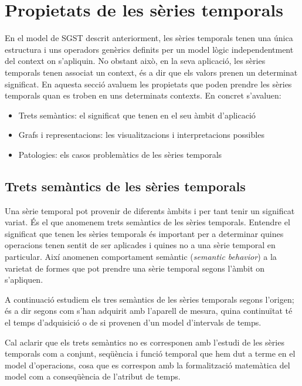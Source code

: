 \section{Propietats de les sèries temporals}

En el model de \gls{SGST} descrit anteriorment, les sèries temporals
tenen una única estructura i uns operadors genèrics definits per un
model lògic independentment del context on s'apliquin. No obstant
això, en la seva aplicació, les sèries temporals tenen associat un
context, és a dir que els valors prenen un determinat significat. En
aquesta secció avaluem les propietats que poden prendre les sèries
temporals quan es troben en uns determinats contexts. En concret
s'avaluen:
\begin{itemize}
\item Trets semàntics: el significat que tenen en
  el seu àmbit d'aplicació
\item Grafs i representacions: les visualitzacions i interpretacions
  possibles
\item Patologies: els casos problemàtics de les sèries temporals
\end{itemize}




\subsection{Trets semàntics de les sèries temporals}
\label{sec:sgst:tretssemantics}

Una sèrie temporal pot provenir de diferents àmbits i per tant tenir
un significat variat. És el que anomenem trets semàntics de les sèries
temporals. Entendre el significat que tenen les sèries temporals és
important per a determinar quines operacions tenen sentit de ser
aplicades i quines no a una sèrie temporal en particular. Així
\textcite{segev87:sigmod} anomenen comportament semàntic
(\emph{semantic behavior}) a la varietat de formes que pot prendre una
sèrie temporal segons l'àmbit on s'apliquen.


A continuació estudiem els tres semàntics de les sèries temporals
segons l'origen; és a dir segons com s'han adquirit amb l'aparell de
mesura, quina continuïtat té el temps d'adquisició o de si provenen
d'un model d'intervals de temps.


Cal aclarir que els trets semàntics no es corresponen amb
l'estudi de les sèries temporals com a conjunt, seqüència i funció
temporal que hem dut a terme en el model d'operacions, cosa que es
correspon amb la formalització matemàtica del model com a conseqüència
de l'atribut de temps.


